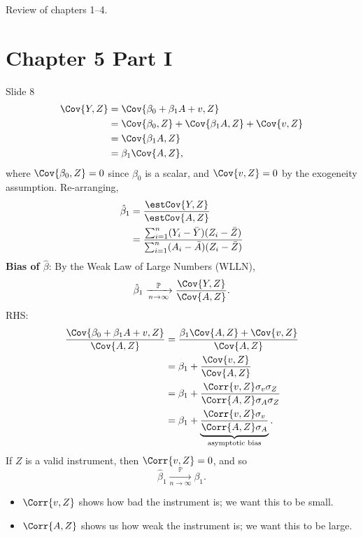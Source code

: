 Review of chapters 1--4.
\section*{Chapter 5 Part I}
\begin{Regular}{Slide 8}
    \begin{align*}
        \Cov{Y,Z}
         & =\Cov{\beta_0+\beta_1A+v,Z}                 \\
         & =\Cov{\beta_0,Z}+\Cov{\beta_1A,Z}+\Cov{v,Z} \\
         & =\Cov{\beta_1A,Z}                           \\
         & =\beta_1\Cov{A,Z},
    \end{align*}
    where $ \Cov{\beta_0,Z}=0 $ since $ \beta_0 $ is a scalar, and $ \Cov{v,Z}=0 $ by the exogeneity assumption.
    Re-arranging,
    \begin{align*}
        \hat{\beta}_1
         & =\frac{\estCov{Y,Z}}{\estCov{A,Z}}                                                         \\
         & =\frac{\sum_{i=1}^{n}(Y_i-\bar{Y})(Z_i-\bar{Z})}{\sum_{i=1}^{n}(A_i-\bar{A})(Z_i-\bar{Z})}
    \end{align*}
    \textbf{Bias of $ \hat{\beta} $}: By the Weak Law of Large Numbers (WLLN),
    \[ \hat{\beta}_1\xrightarrow[n\to\infty]{\mathbb{P}}\frac{\Cov{Y,Z}}{\Cov{A,Z}}. \]
    RHS\@:
    \begin{align*}
        \frac{\Cov{\beta_0+\beta_1A+v,Z}}{\Cov{A,Z}}
         & =\frac{\beta_1\Cov{A,Z}+\Cov{v,Z}}{\Cov{A,Z}}                                                 \\
         & =\beta_1+\frac{\Cov{v,Z}}{\Cov{A,Z}}                                                          \\
         & =\beta_1+\frac{\Corr{v,Z}\sigma_v\sigma_Z}{\Corr{A,Z}\sigma_A\sigma_Z}                        \\
         & =\beta_1+\underbrace{\frac{\Corr{v,Z}\sigma_v}{\Corr{A,Z}\sigma_A}}_{\text{asymptotic bias}}.
    \end{align*}
    If $ Z $ is a valid instrument, then $ \Corr{v,Z}=0 $, and so
    \[ \hat{\beta}_1\xrightarrow[n\to\infty]{\mathbb{P}}\beta_1. \]
    \begin{itemize}
        \item $ \Corr{v,Z} $ shows how bad the instrument is; we want this to be small.
        \item $ \Corr{A,Z} $ shows us how weak the instrument is; we want this to be large.

\end{itemize}
\end{Regular}
